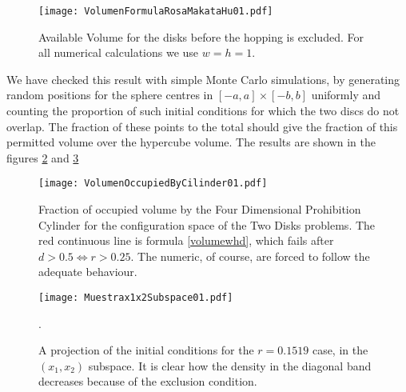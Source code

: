 \documentclass[a4paper,10pt]{article}
\begin{document}
\begin{figure}
\centering
\texttt{[image: VolumenFormulaRosaMakataHu01.pdf]}
\caption{Available Volume for the disks before the hopping
is excluded. For all numerical calculations we use $w=h=1$.}
\label{VolFRM}
\end{figure}


We have checked this result with simple Monte Carlo simulations, 
by generating random positions for the sphere centres in 
$[-a,a] \times [-b,b]$ uniformly and 
counting the proportion of such initial conditions for 
which the two discs do not overlap. The fraction of these points to the 
total should give the fraction of this permitted volume over the hypercube
volume. The results are shown in the figures \ref{VolMonteC} and
\ref{RefMonteCarloExample}

\begin{figure}
\centering
\texttt{[image: VolumenOccupiedByCilinder01.pdf]}
\caption{Fraction of occupied volume by the 
Four Dimensional Prohibition Cylinder for the configuration space of the 
Two Disks problems. The red continuous line is formula \ref{volumewhd}, 
which fails after $d>0.5\Leftrightarrow r>0.25$. The numeric,
of course, are forced to follow the adequate behaviour. 
 }\label{VolMonteC}
\end{figure}

\begin{figure}
\centering
\texttt{[image: Muestrax1x2Subspace01.pdf]}
\caption{ A projection of the initial conditions for the $r=0.1519$ case, in the
$(x_1,x_2)$ subspace. It is clear how the density in the diagonal band decreases
because of the exclusion condition. 
}\label{RefMonteCarloExample}.
\end{figure}
\end{document}
